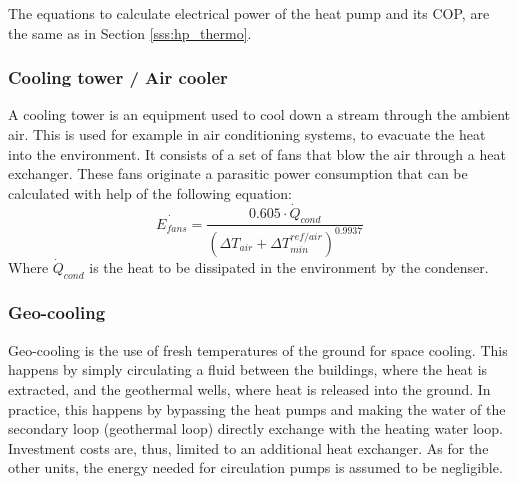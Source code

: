 \documentclass{article}
\begin{document}
The equations to calculate electrical power of the heat pump and its COP, are the same as in Section \ref{sss:hp_thermo}.

\subsubsection{Cooling tower / Air cooler}\label{sss:cooling_tower}
A cooling tower is an equipment used to cool down a stream through the ambient air. This is used for example in air conditioning systems, to evacuate the heat into the environment. It consists of a set of fans that blow the air through a heat exchanger. These fans originate a parasitic power consumption that can be calculated with help of the following equation\cite{henchozPotentialRefrigerantBased}:
\begin{equation}
\dot{E_{fans}} = \frac{0.605 \cdot \dot{Q}_{cond}}{( \Delta T_{air} + \Delta T_{min}^{ref/air})^{0.9937}}
\end{equation}
Where $\dot{Q}_{cond}$ is the heat to be dissipated in the environment by the condenser. 


\subsubsection{Geo-cooling}
Geo-cooling is the use of fresh temperatures of the ground for space cooling. This happens by simply circulating a fluid between the buildings, where the heat is extracted, and the geothermal wells, where heat is released into the ground. In practice, this happens by bypassing the heat pumps and making the water of the secondary loop (geothermal loop) directly exchange with the heating water loop. Investment costs are, thus, limited to an additional heat exchanger. As for the other units, the energy needed for circulation pumps is assumed to be negligible. 

\end{document}
